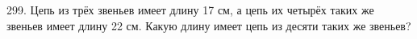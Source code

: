299. Цепь из трёх звеньев имеет длину 17 см, а цепь их четырёх таких же звеньев имеет длину 22 см. Какую длину имеет цепь из десяти таких же звеньев?\\
